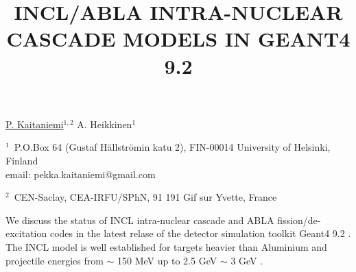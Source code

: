 \documentclass[12pt]{article}
\begin{document}
\title{INCL/ABLA INTRA-NUCLEAR CASCADE MODELS IN GEANT4 9.2}


\underline{P. Kaitaniemi}$^{1, 2}$ A. Heikkinen$^1$ 

$^1$~P.O.Box 64 (Gustaf H\"allstr\"omin katu 2), FIN-00014 University of Helsinki, Finland\\
email: pekka.kaitaniemi@gmail.com

$^2$~CEN-Saclay, CEA-IRFU/SPhN, 91 191 Gif sur Yvette, France


We discuss the status of INCL intra-nuclear cascade and ABLA fission/de-excitation codes
in the latest relase of the detector simulation toolkit Geant4 9.2 \cite{pk09aCollaboration}.
The INCL model is well established for targets heavier than Aluminium
and projectile energies from $\sim$ 150 MeV up to 2.5 GeV $\sim$ 3 GeV \cite{pk08bProceedings}. 
\end{document}
